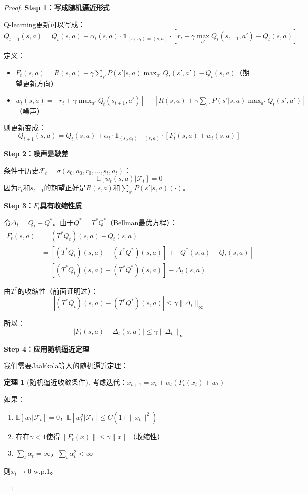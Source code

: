 \documentclass[11pt,a4paper]{article}
\theoremstyle{definition}
\newtheorem{theorem}{定理}[section]
\begin{document}
\begin{proof}
\textbf{Step 1：写成随机逼近形式}

Q-learning更新可以写成：
\[
Q_{t+1}(s,a) = Q_t(s,a) + \alpha_t(s,a) \cdot \mathbf{1}_{(s_t,a_t)=(s,a)} \cdot [r_t + \gamma \max_{a'} Q_t(s_{t+1}, a') - Q_t(s,a)]
\]

定义：
\begin{itemize}
    \item $F_t(s,a) = R(s,a) + \gamma \sum_{s'} P(s'|s,a) \max_{a'} Q_t(s',a') - Q_t(s,a)$（期望更新方向）
    \item $w_t(s,a) = [r_t + \gamma \max_{a'} Q_t(s_{t+1},a')] - [R(s,a) + \gamma \sum_{s'} P(s'|s,a) \max_{a'} Q_t(s',a')]$（噪声）
\end{itemize}

则更新变成：
\[
Q_{t+1}(s,a) = Q_t(s,a) + \alpha_t \cdot \mathbf{1}_{(s_t,a_t)=(s,a)} \cdot [F_t(s,a) + w_t(s,a)]
\]

\textbf{Step 2：噪声是鞅差}

条件于历史$\mathcal{F}_t = \sigma(s_0, a_0, r_0, \ldots, s_t, a_t)$：
\[
\mathbb{E}[w_t(s,a) | \mathcal{F}_t] = 0
\]
因为$r_t$和$s_{t+1}$的期望正好是$R(s,a)$和$\sum_{s'} P(s'|s,a)(\cdot)$。

\textbf{Step 3：$F_t$具有收缩性质}

令$\Delta_t = Q_t - Q^*$。由于$Q^* = T^* Q^*$（Bellman最优方程）：
\begin{align*}
F_t(s,a) &= (T^* Q_t)(s,a) - Q_t(s,a) \\
&= [(T^* Q_t)(s,a) - (T^* Q^*)(s,a)] + [Q^*(s,a) - Q_t(s,a)] \\
&= [(T^* Q_t)(s,a) - (T^* Q^*)(s,a)] - \Delta_t(s,a)
\end{align*}

由$T^*$的收缩性（前面证明过）：
\[
|(T^* Q_t)(s,a) - (T^* Q^*)(s,a)| \leq \gamma \|\Delta_t\|_\infty
\]

所以：
\[
|F_t(s,a) + \Delta_t(s,a)| \leq \gamma \|\Delta_t\|_\infty
\]

\textbf{Step 4：应用随机逼近定理}

我们需要Jaakkola等人的随机逼近定理：

\begin{theorem}[随机逼近收敛条件]
考虑迭代：$x_{t+1} = x_t + \alpha_t(F_t(x_t) + w_t)$

如果：
\begin{enumerate}
    \item $\mathbb{E}[w_t | \mathcal{F}_t] = 0$，$\mathbb{E}[w_t^2 | \mathcal{F}_t] \leq C(1 + \|x_t\|^2)$
    \item 存在$\gamma < 1$使得$\|F_t(x)\| \leq \gamma \|x\|$（收缩性）
    \item $\sum_t \alpha_t = \infty$，$\sum_t \alpha_t^2 < \infty$
\end{enumerate}
则$x_t \to 0$ w.p.1。
\end{theorem}


\end{proof}
\end{document}
